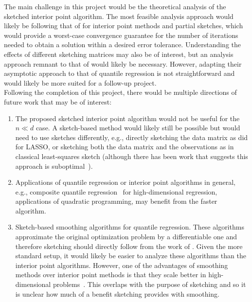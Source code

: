 The main challenge in this project would be the theoretical analysis of the sketched interior point algorithm. The most feasible analysis approach would likely be following that of \citet{Pilanci:2017} for interior point methods and partial sketches, which would provide a worst-case convergence guarantee for the number of iterations needed to obtain a solution within a desired error tolerance. Understanding the effects of different sketching matrices may also be of interest, but an analysis approach remnant to that of \citet{Lacotte:2020} would likely be necessary. However, adapting their asymptotic approach to that of quantile regression is not straightforward and would likely be more suited for a follow-up project.
\\

Following the completion of this project, there would be multiple directions of future work that may be of interest:
\begin{enumerate}
\item
The proposed sketched interior point algorithm would not be useful for the $n\ll d$ case. A sketch-based method would likely still be possible but would need to use sketches differently, e.g., directly sketching the data matrix as \citet{Pham:2015} did for LASSO, or sketching both the data matrix and the observations as in classical least-squares sketch (although there has been work that suggests this approach is suboptimal~\citep{Pilanci:2016}).
\item
Applications of quantile regression or interior point algorithms in general, e.g., composite quantile regression~\citep{Zou:2008} for high-dimensional regression, applications of quadratic programming, may benefit from the faster algorithm.
\item
Sketch-based smoothing algorithms for quantile regression. These algorithms approximate the original optimization problem by a differentiable one and therefore sketching should directly follow from the work of \citet{Pilanci:2017}. Given the more standard setup, it would likely be easier to analyze these algorithms than the interior point algorithms. However, one of the advantages of smoothing methods over interior point methods is that they scale better in high-dimensional problems~\citep{He:2021}. This overlaps with the purpose of sketching and so it is unclear how much of a benefit sketching provides with smoothing.
\end{enumerate}

\iffalse
\newpage


\subsection{Proposal 2: MY OTHER PROPOSAL TITLE} %

\fi